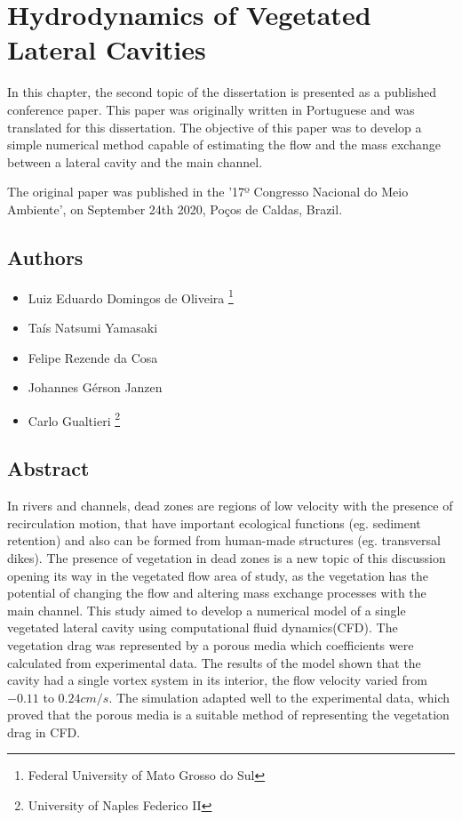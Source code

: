 \chapter{Hydrodynamics of Vegetated Lateral Cavities}
\label{chap:art2}
In this chapter, the second topic of the dissertation is presented as a published conference paper. This paper was originally written in Portuguese and was translated for this dissertation. The objective of this paper was to develop a simple numerical method capable of estimating the flow and the mass exchange between a lateral cavity and the main channel. 

The original paper was published in the '17º Congresso Nacional do Meio Ambiente', on September 24th 2020, Poços de Caldas, Brazil.
\section*{Authors}
\begin{itemize}
    \item Luiz Eduardo Domingos de Oliveira \footnote{Federal University of Mato Grosso do Sul}
    \item Taís Natsumi Yamasaki \footnotemark[1]
    \item Felipe Rezende da Cosa \footnotemark[1]
    \item Johannes Gérson Janzen \footnotemark[1]
    \item Carlo Gualtieri \footnote{University of Naples Federico II}
\end{itemize}
\section*{Abstract}
In rivers and channels, dead zones are regions of low velocity with the presence of recirculation motion, that have important ecological functions (eg. sediment retention) and also can be formed from human-made structures (eg. transversal dikes). The presence of vegetation in dead zones is a new topic of this discussion opening its way in the vegetated flow area of study, as the vegetation has the potential of changing the flow and altering mass exchange processes with the main channel. This study aimed to develop a numerical model of a single vegetated lateral cavity using computational fluid dynamics(CFD). The vegetation drag was represented by a porous media which coefficients were calculated from experimental data. The results of the model shown that the cavity had a single vortex system in its interior, the flow velocity varied from $-0.11$ to $ 0.24 cm/s$. The simulation adapted well to the experimental data, which proved that the porous media is a suitable method of representing the vegetation drag in CFD.

